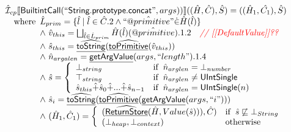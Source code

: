 \documentclass{article}
\makeatletter
\newcommand{\SF}[1]{\mbox{\textsf{#1}}}
\newcommand{\comment}[1]{\textit{#1}}
\newcommand{\wherec}[1]{{\rm where}\begin{array}[t]{l}#1\end{array}}
\newcommand{\ifc}[1]{{\rm if}\begin{array}[t]{l}#1\end{array}}
\newcommand{\owc}{{\rm otherwise}}
\newcommand{\aI}{\hat{\mathcal{I}}}
\newcommand{\lbr}{\llbracket}
\newcommand{\rbr}{\rrbracket}
\newcommand{\hf}[1]{\underline{\sf #1}}
\newcommand{\ahf}[1]{\widehat{\underline{\sf #1}}}
\newcommand{\avarprop}[1]{\hat{@#1}}
\def\inred{\color{red}}
\def\inred{\color{red}}
\makeatother
\begin{document}
\[
\begin{array}{l}

\aI _{cp}\lbr \SF{BuiltintCall}(``\SF{String.prototype.concat}",args))\rbr((\hat{H},\hat{C}), \hat{S})
  = ((\hat{H}_1, \hat{C_1}), \hat{S})\\
\quad\wherec{ 
  \hat{L}_{prim} = \{ \hat{l} \mid \hat{l} \in \hat{C}.2 \land ``\avarprop{primitive}" \dot{\in}\hat{H}(\hat{l}) \}\\
  \land\ \hat{v}_{this} = \bigsqcup_{\hat{l} \in \hat{L}_{prim}} \hat{H}(\hat{l})(\avarprop{primitive}).1.2
    \quad\comment{{\inred // [[DefaultValue]]??}}\\
  \land\ \hat{s}_{this} = \ahf{toString}(\ahf{toPrimitive}(\hat{v}_{this}))\\
  \land\ \hat{n}_{argalen} = \hf{getArgValue}(args, ``length").1.4\\
  \land\ \hat{s} = \left\{\begin{array}{ll}
      \bot_{string}& \ifc{\hat{n}_{arglen} = \bot_{number}}\\
      \top_{string}& \ifc{\hat{n}_{arglen} \neq \SF{UIntSingle}}\\
      \hat{s}_{this} \hat{+} \hat{s}_0 \hat{+} ... \hat{+} \hat{s}_{n-1}& \ifc{\hat{n}_{arglen} = \SF{UIntSingle}(n)}
    \end{array}\right.\\
    \land\ \hat{s}_i = \ahf{toString}(\ahf{toPrimitive}(\hf{getArgValue}(args, ``i")))\\
  \land\ (\hat{H}_1, \hat{C}_1) = 
    \left\{\begin{array}{ll}
      (\ahf{ReturnStore}(\hat{H}, Value(\hat{s}))), \hat{C})
      & \ifc{\hat{s} \not\sqsubseteq \bot_{String}}\\
      (\bot_{heap}, \bot_{context}) & \owc \\
    \end{array}\right.\\
  }\\
\\\\



\end{array}\]
\end{document}
